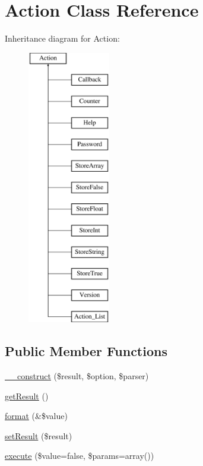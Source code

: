 \hypertarget{class_p_e_a_r2_1_1_console_1_1_command_line_1_1_action}{
\section{\-Action \-Class \-Reference}
\label{class_p_e_a_r2_1_1_console_1_1_command_line_1_1_action}
}
\-Inheritance diagram for \-Action\-:\begin{figure}[H]
\begin{center}
\leavevmode
\includegraphics[height=12.000000cm]{class_p_e_a_r2_1_1_console_1_1_command_line_1_1_action}
\end{center}
\end{figure}
\subsection*{\-Public \-Member \-Functions}
\begin{DoxyCompactItemize}
\item 
\hyperlink{class_p_e_a_r2_1_1_console_1_1_command_line_1_1_action_a3d946951a64ed8c2846fe8fb1c7edec0}{\-\_\-\-\_\-construct} (\$result, \$option, \$parser)
\item 
\hyperlink{class_p_e_a_r2_1_1_console_1_1_command_line_1_1_action_ae077eb8a032a325ceb939bfabfa5f472}{get\-Result} ()
\item 
\hyperlink{class_p_e_a_r2_1_1_console_1_1_command_line_1_1_action_adcda5408e56dac72b67a1e92d37431c3}{format} (\&\$value)
\item 
\hyperlink{class_p_e_a_r2_1_1_console_1_1_command_line_1_1_action_a02644cacaff67ad8a6b92bbe6127321f}{set\-Result} (\$result)
\item 
\hyperlink{class_p_e_a_r2_1_1_console_1_1_command_line_1_1_action_a37f62eb63fef4cc7c2d5f438190b307a}{execute} (\$value=false, \$params=array())
\end{DoxyCompactItemize}
